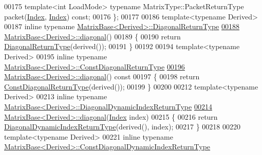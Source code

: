 \begin{DoxyCode}
00175     \textcolor{keyword}{template}<\textcolor{keywordtype}{int} LoadMode> \textcolor{keyword}{typename} MatrixType::PacketReturnType packet(\hyperlink{namespace_eigen_a62e77e0933482dafde8fe197d9a2cfde}{Index},
      \hyperlink{namespace_eigen_a62e77e0933482dafde8fe197d9a2cfde}{Index}) \textcolor{keyword}{const};
00176 \};
00177 
00186 \textcolor{keyword}{template}<\textcolor{keyword}{typename} Derived>
00187 \textcolor{keyword}{inline} \textcolor{keyword}{typename} \hyperlink{group___core___module_class_eigen_1_1_diagonal}{MatrixBase<Derived>::DiagonalReturnType}
\hyperlink{group___core___module_ab5768147536273eb2dbdfa389cfd26a3}{00188} \hyperlink{group___core___module_ab5768147536273eb2dbdfa389cfd26a3}{MatrixBase<Derived>::diagonal}()
00189 \{
00190   \textcolor{keywordflow}{return} \hyperlink{group___core___module_class_eigen_1_1_diagonal}{DiagonalReturnType}(derived());
00191 \}
00192 
00194 \textcolor{keyword}{template}<\textcolor{keyword}{typename} Derived>
00195 \textcolor{keyword}{inline} \textcolor{keyword}{typename} \hyperlink{group___core___module_class_eigen_1_1_transpose}{MatrixBase<Derived>::ConstDiagonalReturnType}
\hyperlink{group___core___module_aebdeedcf67e46d969c556c6c7d9780ee}{00196} \hyperlink{group___core___module_ab5768147536273eb2dbdfa389cfd26a3}{MatrixBase<Derived>::diagonal}()\textcolor{keyword}{ const}
00197 \textcolor{keyword}{}\{
00198   \textcolor{keywordflow}{return} \hyperlink{group___core___module_class_eigen_1_1_transpose}{ConstDiagonalReturnType}(derived());
00199 \}
00200 
00212 \textcolor{keyword}{template}<\textcolor{keyword}{typename} Derived>
00213 \textcolor{keyword}{inline} \textcolor{keyword}{typename} \hyperlink{group___core___module_class_eigen_1_1_diagonal}{MatrixBase<Derived>::DiagonalDynamicIndexReturnType}
\hyperlink{group___core___module_a8a13d4b8efbd7797ee8efd3dd988a7f7}{00214} \hyperlink{group___core___module_ab5768147536273eb2dbdfa389cfd26a3}{MatrixBase<Derived>::diagonal}(\hyperlink{namespace_eigen_a62e77e0933482dafde8fe197d9a2cfde}{Index} index)
00215 \{
00216   \textcolor{keywordflow}{return} \hyperlink{group___core___module_class_eigen_1_1_diagonal}{DiagonalDynamicIndexReturnType}(derived(), index);
00217 \}
00218 
00220 \textcolor{keyword}{template}<\textcolor{keyword}{typename} Derived>
00221 \textcolor{keyword}{inline} \textcolor{keyword}{typename} \hyperlink{group___core___module_class_eigen_1_1_transpose}{MatrixBase<Derived>::ConstDiagonalDynamicIndexReturnType}

\end{DoxyCode}
